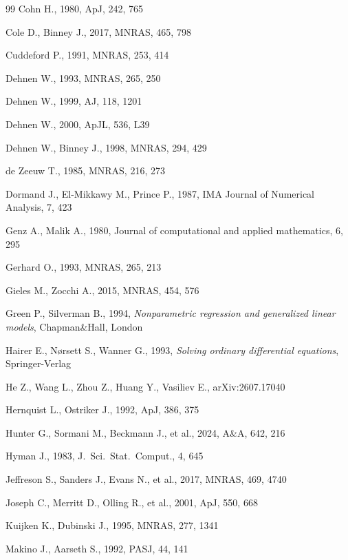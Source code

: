 \documentclass[12pt]{article}
\begin{document}
\begin{thebibliography}{99}
Cohn H., 1980, ApJ, 242, 765

Cole D., Binney J., 2017, MNRAS, 465, 798

Cuddeford P., 1991, MNRAS, 253, 414

Dehnen W., 1993, MNRAS, 265, 250

Dehnen W., 1999, AJ, 118, 1201

Dehnen W., 2000, ApJL, 536, L39

Dehnen W., Binney J., 1998, MNRAS, 294, 429

de Zeeuw T., 1985, MNRAS, 216, 273

Dormand J., El-Mikkawy M., Prince P., 1987, IMA Journal of Numerical Analysis, 7, 423

Genz A., Malik A., 1980, Journal of computational and applied mathematics, 6, 295

Gerhard O., 1993, MNRAS, 265, 213

Gieles M., Zocchi A., 2015, MNRAS, 454, 576

Green P., Silverman B., 1994, \textsl{Nonparametric regression and generalized linear models}, Chapman\&Hall, London

Hairer E., N{\o}rsett S., Wanner G., 1993, \textsl{Solving ordinary differential equations}, Springer-Verlag

He Z., Wang L., Zhou Z., Huang Y., Vasiliev E., arXiv:2607.17040

Hernquist L., Ostriker J., 1992, ApJ, 386, 375

Hunter G., Sormani M., Beckmann J., et al., 2024, A\&A, 642, 216

Hyman J., 1983, J.~Sci.~Stat.~Comput., 4, 645

Jeffreson S., Sanders J., Evans N., et al., 2017, MNRAS, 469, 4740

Joseph C., Merritt D., Olling R., et al., 2001, ApJ, 550, 668

Kuijken K., Dubinski J., 1995, MNRAS, 277, 1341

Makino J., Aarseth S., 1992, PASJ, 44, 141


\end{thebibliography}
\end{document}
